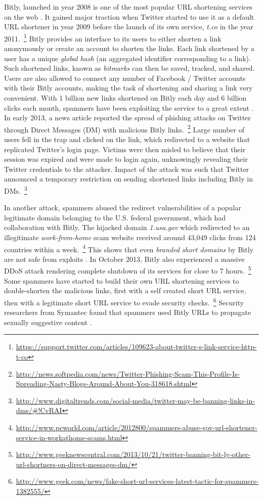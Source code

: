 \documentclass[conference]{IEEEtran}
\begin{document}
Bitly, launched in year 2008 is one of the most popular URL shortening services on the web \cite{18}. It gained major traction when Twitter started to use it as a default URL shortener in year 2009 before the launch of its own service, \textit{t.co} in the year 2011.~\footnote{\url{https://support.twitter.com/articles/109623-about-twitter-s-link-service-http-t-co}} Bitly provides an interface to its users to either shorten a link anonymously or create an account to shorten the links. Each link shortened by a user has a unique \textit{global hash} (an aggregated identifier corresponding to a link). Such shortened links, known as \textit{bitmarks} can then be saved, tracked, and shared. Users are also allowed to connect any number of Facebook / Twitter accounts with their Bitly accounts, making the task of shortening and sharing a link very convenient. With 1 billion new links shortened on Bitly each day and 6 billion clicks each month, spammers have been exploiting the service to a great extent \cite{27}. In early 2013, a news article reported the spread of phishing attacks on Twitter through Direct Messages (DM) with malicious Bitly links.~\footnote{\url{http://news.softpedia.com/news/Twitter-Phishing-Scam-This-Profile-Is-Spreading-Nasty-Blogs-Around-About-You-318618.shtml}} Large number of users fell in the trap and clicked on the link, which redirected to a website that replicated Twitter's login page. Victims were then misled to believe that their session was expired and were made to login again, unknowingly revealing their Twitter credentials to the attacker. Impact of the attack was such that Twitter announced a temporary restriction on sending shortened links including Bitly in DMs.~\footnote{\url{http://www.digitaltrends.com/social-media/twitter-may-be-banning-links-in-dms/\#!CvRAI}}

In another attack, spammers abused the redirect vulnerabilities of a popular legitimate domain belonging to the U.S. federal government, which had collaboration with Bitly. The hijacked domain \textit{1.usa.gov} which redirected to an illegitimate \textit{work-from-home} scam website received around 43,049 clicks from 124 countries within a week.~\footnote{\url{http://www.pcworld.com/article/2012800/spammers-abuse-gov-url-shortener-service-in-workathome-scams.html}} This shows that even \textit{branded short domains} by Bitly are not safe from exploits \cite{28}. 
In October 2013, Bitly also experienced a massive DDoS attack rendering complete shutdown of its services for close to 7 hours.~\footnote{\url{http://www.geeknewscentral.com/2013/10/21/twitter-banning-bit-ly-other-url-shortners-on-direct-messages-dm/}} Some spammers have started to build their own URL shortening services to double-shorten the malicious links, first with a self created short URL service, then with a legitimate short URL service to evade security checks.~\footnote{\url{http://www.geek.com/news/fake-short-url-services-latest-tactic-for-spammers-1382555/}} Security researchers from Symantec found that spammers used Bitly URLs to propagate sexually suggestive content \cite{16}. 
\end{document}
